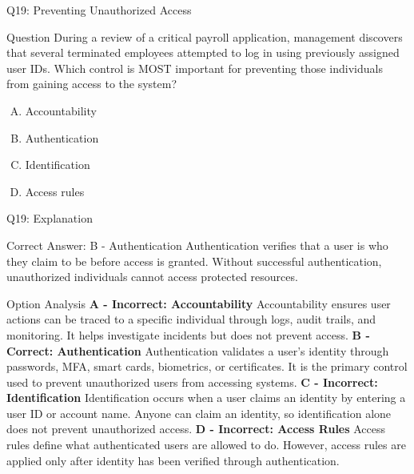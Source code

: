 \documentclass{beamer}
\begin{document}
	\begin{frame}{Q19: Preventing Unauthorized Access} \begin{block}{Question} During a review of a critical payroll application, management discovers that several terminated employees attempted to log in using previously assigned user IDs. Which control is MOST important for preventing those individuals from gaining access to the system? \end{block} \begin{enumerate}[(A)] \item Accountability \item Authentication \item Identification \item Access rules \end{enumerate} \end{frame} \begin{frame}[shrink=10]{Q19: Explanation} \footnotesize \begin{block}{Correct Answer: B - Authentication} Authentication verifies that a user is who they claim to be before access is granted. Without successful authentication, unauthorized individuals cannot access protected resources. \end{block} \begin{block}{Option Analysis} \textbf{A - Incorrect: Accountability} Accountability ensures user actions can be traced to a specific individual through logs, audit trails, and monitoring. It helps investigate incidents but does not prevent access. \vspace{0.15cm} \textbf{B - Correct: Authentication} Authentication validates a user's identity through passwords, MFA, smart cards, biometrics, or certificates. It is the primary control used to prevent unauthorized users from accessing systems. \vspace{0.15cm} \textbf{C - Incorrect: Identification} Identification occurs when a user claims an identity by entering a user ID or account name. Anyone can claim an identity, so identification alone does not prevent unauthorized access. \vspace{0.15cm} \textbf{D - Incorrect: Access Rules} Access rules define what authenticated users are allowed to do. However, access rules are applied only after identity has been verified through authentication. \end{block}  \end{frame}
	
\end{document}
